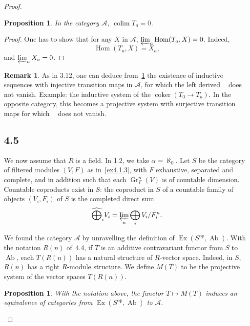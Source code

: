 \documentclass[11pt,a4paper]{article}
\theoremstyle{plain}
\newtheorem{proposition}[theorem]{Proposition}
\theoremstyle{definition}
\newtheorem{remark}[theorem]{Remark}
\DeclareMathOperator{\Hom}{Hom}
\DeclareMathOperator{\colim}{colim}
\DeclareMathOperator{\colimone}{\colim\nolimits^{1}}
\DeclareMathOperator{\limone}{\lim\nolimits^{1}}
\DeclareMathOperator{\Ex}{Ex}
\DeclareMathOperator{\Ab}{Ab}
\DeclareMathOperator{\coker}{coker}
\DeclareMathOperator{\Gr}{Gr}
\newcommand{\op}{\mathrm{op}}
\numberwithin{equation}{section}
\begin{document}
\begin{proof}
\begin{proposition}\label{prop4.4.1}
In the category $\mathcal{A}$, $\colim T_{a} = 0$.
\end{proposition}

\begin{proof}
One has to show that for any $X$ in $\mathcal{A}$, $\varprojlim_{a} \Hom(T_{a},X) = 0$. Indeed,
\begin{equation}\label{eq4.4.2}
\Hom(T_{a},X) = X_{a},
\tag{4.4.2}
\end{equation}
and $\varprojlim_{a} X_{a} = 0$.
\end{proof}

\begin{remark}\label{rem4.4.3}
As in 3.12, one can deduce from~\ref{prop4.4.1} the existence of inductive sequences with injective transition maps in $\mathcal{A}$, for which the left derived $\colimone$ does not vanish. Example: the inductive system of the $\coker(T_{0} \to T_{a})$. In the opposite category, this becomes a projective system with surjective transition maps for which $\limone$ does not vanish.
\end{remark}

\subsection*{4.5}

We now assume that $R$ is a field. In 1.2, we take $\alpha = \aleph_{0}$. Let $S$ be the category of filtered modules $(V,F)$ as in~\ref{ex4.1.3}, with $F$ exhaustive, separated and complete, and in addition such that each $\Gr^{n}_{F}(V)$ is of countable dimension. Countable coproducts exist in $S$: the coproduct in $S$ of a countable family of objects $(V_{i},F_{i})$ of $S$ is the completed direct sum
\begin{equation*}
\widehat{\bigoplus}_{i} V_{i} = \varprojlim_{n} \bigoplus_{i} V_{i}/F_{i}^{n}.
\end{equation*}

We found the category $\mathcal{A}$ by unravelling the definition of $\Ex(S^{\op},\Ab)$. With the notation $R(n)$ of~4.4, if $T$ is an additive contravariant functor from $S$ to $\Ab$, each $T(R(n))$ has a natural structure of $R$-vector space. Indeed, in $S$, $R(n)$ has a right $R$-module structure. We define $M(T)$ to be the projective system of the vector spaces $T(R(n))$.

\begin{proposition}\label{prop4.5.1}
With the notation above, the functor $T \mapsto M(T)$ induces an equivalence of categories from $\Ex(S^{\op},\Ab)$ to $\mathcal{A}$.
\end{proposition}


\end{proof}
\end{document}

